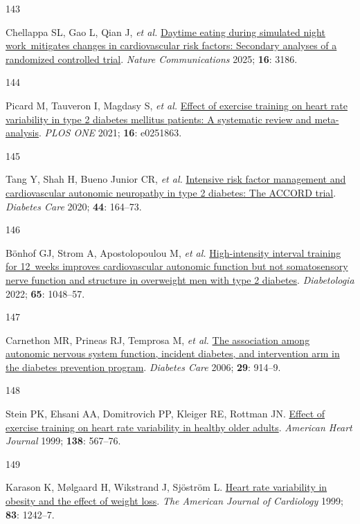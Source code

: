 \documentclass[
  a4paper,
  headsepline=true,
  open=left]{scrbook}
\newlength{\cslhangindent}
\newlength{\csllabelwidth}
\newlength{\cslentryspacingunit} %
\newenvironment{CSLReferences}[2] %
 {%
  \setlength{\parindent}{0pt}
  \ifodd #1
  \let\oldpar\par
  \def\par{\hangindent=\cslhangindent\oldpar}
  \fi
  \setlength{\parskip}{#2\cslentryspacingunit}
 }%
 {}
\newcommand{\CSLLeftMargin}[1]{\parbox[t]{\csllabelwidth}{#1}}
\newcommand{\CSLRightInline}[1]{\parbox[t]{\linewidth - \csllabelwidth}{#1}\break}
\begin{document}
\begin{CSLReferences}{0}{0}
\leavevmode{}%
\CSLLeftMargin{143 }%
\CSLRightInline{Chellappa SL, Gao L, Qian J, \emph{et al.}
\href{https://doi.org/10.1038/s41467-025-57846-y}{Daytime eating during
simulated night work~mitigates changes in cardiovascular risk factors:
Secondary analyses of a randomized controlled trial}. \emph{Nature
Communications} 2025; \textbf{16}: 3186.}

\leavevmode{}%
\CSLLeftMargin{144 }%
\CSLRightInline{Picard M, Tauveron I, Magdasy S, \emph{et al.}
\href{https://doi.org/10.1371/journal.pone.0251863}{Effect of exercise
training on heart rate variability in type 2 diabetes mellitus patients:
A systematic review and meta-analysis}. \emph{PLOS ONE} 2021;
\textbf{16}: e0251863.}

\leavevmode{}%
\CSLLeftMargin{145 }%
\CSLRightInline{Tang Y, Shah H, Bueno Junior CR, \emph{et al.}
\href{https://doi.org/10.2337/dc20-1842}{Intensive risk factor
management and cardiovascular autonomic neuropathy in type 2 diabetes:
The ACCORD trial}. \emph{Diabetes Care} 2020; \textbf{44}: 164--73.}

\leavevmode{}%
\CSLLeftMargin{146 }%
\CSLRightInline{Bönhof GJ, Strom A, Apostolopoulou M, \emph{et al.}
\href{https://doi.org/10.1007/s00125-022-05674-w}{High-intensity
interval training for 12~weeks improves cardiovascular autonomic
function but not somatosensory nerve function and structure in
overweight men with type 2 diabetes}. \emph{Diabetologia} 2022;
\textbf{65}: 1048--57.}

\leavevmode{}%
\CSLLeftMargin{147 }%
\CSLRightInline{Carnethon MR, Prineas RJ, Temprosa M, \emph{et al.}
\href{https://doi.org/10.2337/diacare.29.04.06.dc05-1729}{The
association among autonomic nervous system function, incident diabetes,
and intervention arm in the diabetes prevention program}. \emph{Diabetes
Care} 2006; \textbf{29}: 914--9.}

\leavevmode{}%
\CSLLeftMargin{148 }%
\CSLRightInline{Stein PK, Ehsani AA, Domitrovich PP, Kleiger RE, Rottman
JN. \href{https://doi.org/10.1016/S0002-8703(99)70162-6}{Effect of
exercise training on heart rate variability in healthy older adults}.
\emph{American Heart Journal} 1999; \textbf{138}: 567--76.}

\leavevmode{}%
\CSLLeftMargin{149 }%
\CSLRightInline{Karason K, Mølgaard H, Wikstrand J, Sjöström L.
\href{https://doi.org/10.1016/S0002-9149(99)00066-1}{Heart rate
variability in obesity and the effect of weight loss}. \emph{The
American Journal of Cardiology} 1999; \textbf{83}: 1242--7.}


\end{CSLReferences}
\end{document}
